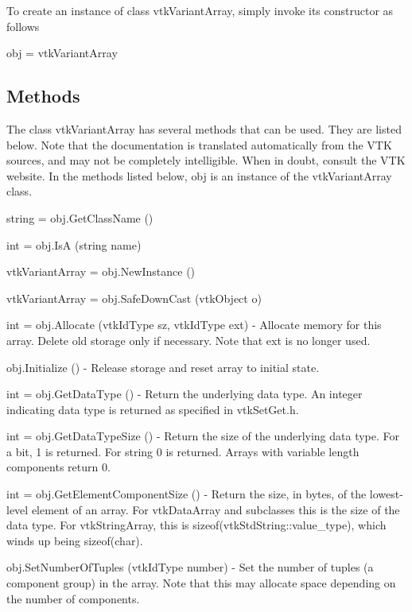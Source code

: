 To create an instance of class vtk\-Variant\-Array, simply invoke its constructor as follows \begin{DoxyVerb}  obj = vtkVariantArray
\end{DoxyVerb}
 \hypertarget{vtkwidgets_vtkxyplotwidget_Methods}{}\subsection{Methods}\label{vtkwidgets_vtkxyplotwidget_Methods}
The class vtk\-Variant\-Array has several methods that can be used. They are listed below. Note that the documentation is translated automatically from the V\-T\-K sources, and may not be completely intelligible. When in doubt, consult the V\-T\-K website. In the methods listed below, {\ttfamily obj} is an instance of the vtk\-Variant\-Array class. 
\begin{DoxyItemize}
\item {\ttfamily string = obj.\-Get\-Class\-Name ()}  
\item {\ttfamily int = obj.\-Is\-A (string name)}  
\item {\ttfamily vtk\-Variant\-Array = obj.\-New\-Instance ()}  
\item {\ttfamily vtk\-Variant\-Array = obj.\-Safe\-Down\-Cast (vtk\-Object o)}  
\item {\ttfamily int = obj.\-Allocate (vtk\-Id\-Type sz, vtk\-Id\-Type ext)} -\/ Allocate memory for this array. Delete old storage only if necessary. Note that ext is no longer used.  
\item {\ttfamily obj.\-Initialize ()} -\/ Release storage and reset array to initial state.  
\item {\ttfamily int = obj.\-Get\-Data\-Type ()} -\/ Return the underlying data type. An integer indicating data type is returned as specified in vtk\-Set\-Get.\-h.  
\item {\ttfamily int = obj.\-Get\-Data\-Type\-Size ()} -\/ Return the size of the underlying data type. For a bit, 1 is returned. For string 0 is returned. Arrays with variable length components return 0.  
\item {\ttfamily int = obj.\-Get\-Element\-Component\-Size ()} -\/ Return the size, in bytes, of the lowest-\/level element of an array. For vtk\-Data\-Array and subclasses this is the size of the data type. For vtk\-String\-Array, this is sizeof(vtk\-Std\-String\-::value\-\_\-type), which winds up being sizeof(char).  
\item {\ttfamily obj.\-Set\-Number\-Of\-Tuples (vtk\-Id\-Type number)} -\/ Set the number of tuples (a component group) in the array. Note that this may allocate space depending on the number of components.  

\end{DoxyItemize}
